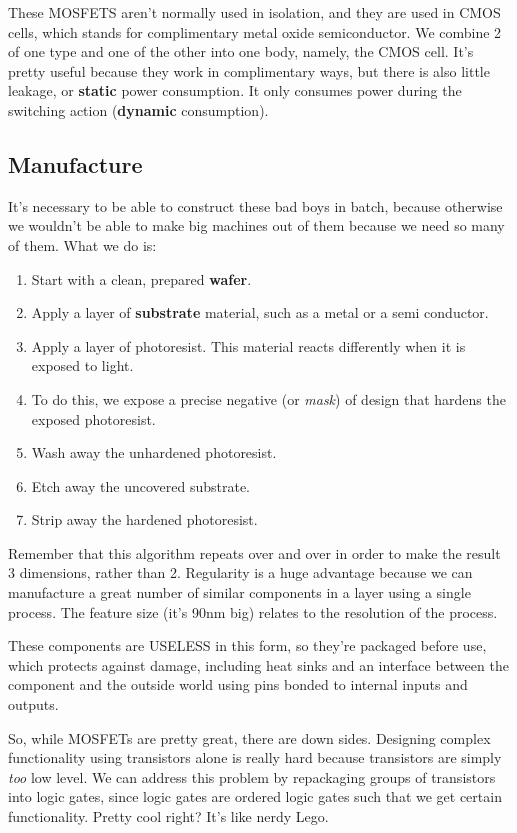 \documentclass[11pt,a4paper,titlepage,dvipsnames,cmyk]{scrartcl}
\begin{document}
These MOSFETS aren't normally used in isolation, and they are used in CMOS
cells, which stands for complimentary metal oxide semiconductor. We combine 2 of
one type and one of the other into one body, namely, the CMOS cell. It's pretty
useful because they work in complimentary ways, but there is also little
leakage, or \textbf{static} power consumption. It only consumes power during the
switching action (\textbf{dynamic} consumption).

\subsection{Manufacture}%
\label{sub:Manufacture}
It's necessary to be able to construct these bad boys in batch, because
otherwise we wouldn't be able to make big machines out of them because we need
so many of them. What we do is:
\begin{enumerate}
    \item Start with a clean, prepared \textbf{wafer}.
    \item Apply a layer of \textbf{substrate} material, such as a metal or a
        semi conductor.
    \item Apply a layer of photoresist. This material reacts differently when it
        is exposed to light.
    \item To do this, we expose a precise negative (or \textit{mask}) of design
        that hardens the exposed photoresist.
    \item Wash away the unhardened photoresist.
    \item Etch away the uncovered substrate.
    \item Strip away the hardened photoresist.
\end{enumerate}

Remember that this algorithm repeats over and over in order to make the result 3
dimensions, rather than 2. Regularity is a huge advantage because we can
manufacture a great number of similar components in a layer using a single
process. The feature size (it's 90nm big) relates to the resolution of the
process.

These components are USELESS in this form, so they're packaged before use, which
protects against damage, including heat sinks and an interface between the
component and the outside world using pins bonded to internal inputs and
outputs.

So, while MOSFETs are pretty great, there are down sides. Designing
complex functionality using transistors alone is really hard because
transistors are simply \textit{too} low level. We can address this problem
by repackaging groups of transistors into logic gates, since logic gates
are ordered logic gates such that we get certain functionality. Pretty
cool right? It's like nerdy Lego.
\end{document}
